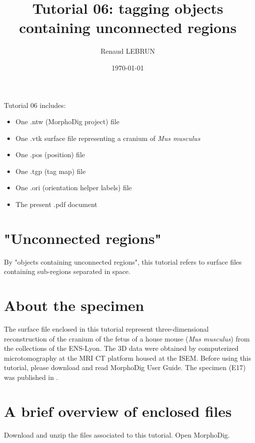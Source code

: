 \documentclass[12pt, a4paper]{book}
\title{Tutorial 06: tagging objects containing unconnected regions}
\author{Renaud LEBRUN}
\affil{Institut des Sciences de l'Evolution, Université de Montpellier, France}
\date{\today}
\begin{document}
	\dominitoc

\maketitle


\faketableofcontents



\minitoc 
Tutorial 06 includes:
\begin{itemize}
\item One .ntw (MorphoDig project) file
\item One .vtk surface file representing a cranium of \textit{Mus musculus}
\item One .pos (position) file 
\item One .tgp (tag map) file 
\item One .ori (orientation helper labels) file 
\item The present .pdf document
\end{itemize}




\section{"Unconnected regions"}
By "objects containing unconnected regions", this tutorial refers to surface files containing sub-regions separated in space.

\section{About the specimen}

The surface file enclosed in this tutorial represent three-dimensional reconstruction of the cranium of the fetus of a house mouse (\textit{Mus musculus}) from the collections of the ENS-Lyon. The 3D data were obtained by computerized microtomography at the MRI \si{\micro} CT platform housed at the ISEM.
Before using this tutorial, please download and read MorphoDig User Guide. The specimen (E17) was published in \citet{Hautier2014}.


\section{A brief overview of enclosed files}
		Download and unzip the files associated to this tutorial. Open MorphoDig.
\end{document}
